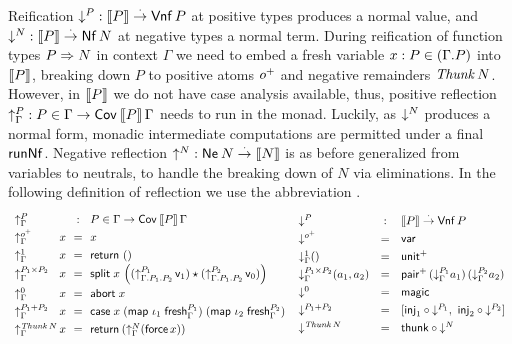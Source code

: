 \documentclass[a4paper,USenglish,cleveref, autoref]{lipics-v2019}
\begin{document}
Reification $\mathord{\downarrow_{}^{P}} : \mathopen{{[\kern-0.14em[}} P \mathclose{{]\kern-0.14em]}} \stackrel{\cdot}{\to} \mathsf{Vnf}\,P$ at positive types produces
a normal value, and $\mathord{\downarrow_{}^{N}} : \mathopen{{[\kern-0.14em[}} P \mathclose{{]\kern-0.14em]}} \stackrel{\cdot}{\to} \mathsf{Nf}\,N$ at negative types a
normal term.  During reification of function types $P \Rightarrow N$ in
context $\Gamma$ we need to embed a fresh variable
$x : P \in (\Gamma.P)$ into $\mathopen{{[\kern-0.14em[}} P \mathclose{{]\kern-0.14em]}}$, breaking down $P$ to
positive atoms $o^+$ and negative remainders $\mathit{Thunk}\,N$.
However, in $\mathopen{{[\kern-0.14em[}} P \mathclose{{]\kern-0.14em]}}$ we do not have case analysis available, thus,
positive reflection $\mathord{\uparrow_{\Gamma}^{P}} : P \in \Gamma \to \mathsf{Cov}^{}\,\mathopen{{[\kern-0.14em[}} P \mathclose{{]\kern-0.14em]}}\,\Gamma$
needs to run in the monad.  Luckily, as $\mathord{\downarrow_{}^{N}}$ produces a normal
form, monadic intermediate computations are permitted under a final
$\mathsf{runNf}^{}$.  Negative reflection $\mathord{\uparrow_{}^{N}} : \mathsf{Ne}^{}\,N \stackrel{\cdot}{\to} \mathopen{{[\kern-0.14em[}} N \mathclose{{]\kern-0.14em]}}$ is as
before generalized from variables to neutrals, to handle the breaking
down of $N$ via eliminations.
%
In the following definition of reflection we use the abbreviation
.
\[
\def\arraystretch{1.3}
\begin{array}{l@{\,}l@{~~}c@{~~}l}
  \multicolumn 2 l {\upG P} & : & P \in \Gamma \to \Cov\,\den P \, \Gamma\\
  \upG {\patom}         & x & = & x \\
  \upG {\tyone}         & x & = & \treturn\;\ttempty \\
  \upG {P_1 \times P_2} & x & = & \tsplit\;x\,
    \left(
     (\up[\cext{\cext \Gamma {P_1}}{P_2}]{P_1}\,\vv1)
     \star
     (\up[\cext{\cext \Gamma {P_1}}{P_2}]{P_2}\,\vv0)
    \right) \\
  \upG{\tyzero}         & x & = & \tabort\;x \\
  \upG{P_1 + P_2}       & x & = & \tcase\;x
    \; (\tmap\;\iota_1\;\tfresh^{P_1}_\Gamma)
    \; (\tmap\;\iota_2\;\tfresh^{P_2}_\Gamma)
    \\
  \upG{\Thunk N} & x & = & \treturn\,(\upG N (\tforce\,x)) \\
\end{array}
\,
\begin{array}{lcl}
  \down P & : & \den P \todot \tVNf\,P \\
  \down {\patom} & = & \tvar \\
  \downG {\tyone} () & = & \punit \\
  \downG {P_1 \times P_2}(a_1,a_2) & = & \ppair
    \,(\downG {P_1} a_1)
    \,(\downG {P_2} a_2)
    \\
  \down {\tyzero} & = & \tmagic \\
  \down {P_1 + P_2} & = &
    [  \tinj_1 \comp \down{P_1}
    ,\ \tinj_2 \comp \down{P_2}
    ] \\
  \down {\Thunk N} & = & \tthunk \circ \down N \\
\end{array}
\]
\end{document}
